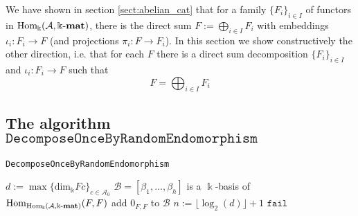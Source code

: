 
We have shown in section \ref{sect:abelian_cat} that for a family $\{F_{i}\}_{i\in I}$ of functors in $\mathrm{Hom_{\Bbbk}}(\mathcal{A},\Bbbk\textnormal{-}\mathbf{mat})$, there is the
direct sum $F := \bigoplus_{i\in I} F_{i}$ with embeddings $\iota_{i} : F_{i} \rightarrow F$ (and projections $\pi_{i} : F \rightarrow F_{i}$).
In this section we show constructively the other direction, i.e. that for each $F$ there is a direct sum decomposition
$\{F_{i}\}_{i\in I}$ and $\iota_{i} : F_{i} \rightarrow F$ such that
\[
F = \bigoplus_{i\in I} F_{i}
\]

\subsection{The algorithm $\mathtt{DecomposeOnceByRandomEndomorphism}$}

\begin{algorithm}[H]\capstart
    \caption{\texttt{DecomposeOnceByRandomEndomorphism}}\label{algo:DecomposeOnceByRandomEndomorphism}
	\BlankLine
	$d := \max \{ \mathrm{dim}_{\Bbbk}Fc \}_{c \in \mathcal{A}_{0}}$\;
	$\mathcal{B} = [\beta_{1},\dots,\beta_{h}]$ is a $\Bbbk$-basis of $\mathrm{Hom}_{\mathrm{Hom_{\Bbbk}}(\mathcal{A},\Bbbk\textnormal{-}\mathbf{mat})}(F,F)$\;
	add $0_{F,F}$ to $\mathcal{B}$\;
	$n := \lfloor\log_{2}(d)\rfloor + 1$\;
	\BlankLine
	\BlankLine
	\Return $\mathtt{fail}$
\end{algorithm}

